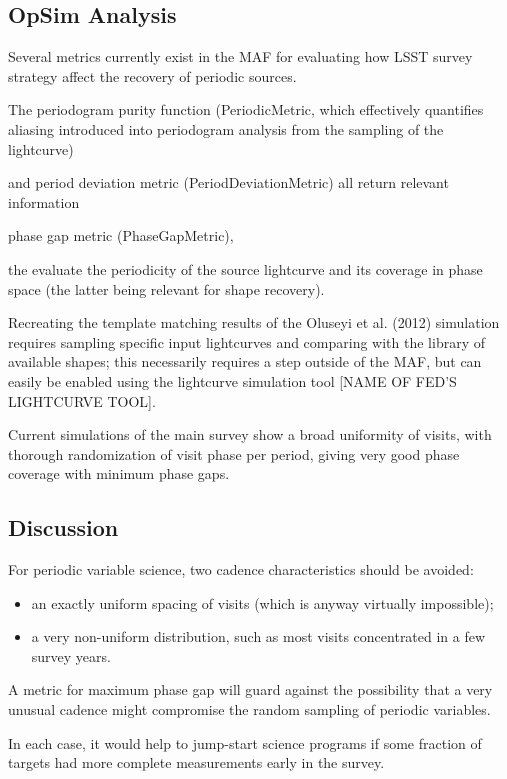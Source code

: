 
\subsection{OpSim Analysis}
\label{sec:\secname:analysis}


Several metrics currently exist in the MAF for evaluating how LSST survey strategy affect the recovery of periodic sources. 

The periodogram purity function (PeriodicMetric, which effectively quantifies aliasing introduced into periodogram analysis from the sampling of the lightcurve)

and period deviation metric (PeriodDeviationMetric) all return relevant information 

phase gap metric (PhaseGapMetric),

the evaluate the periodicity of the source lightcurve and its coverage in phase space (the latter being relevant for shape recovery). 

Recreating the template matching results of the Oluseyi et al. (2012) simulation requires sampling specific input lightcurves and comparing with the library of available shapes; this necessarily requires a step outside of the MAF, but can easily be enabled using the lightcurve simulation tool [NAME OF FED'S LIGHTCURVE TOOL].
 



Current simulations of the main survey show a broad uniformity of visits, with thorough randomization of visit phase per period, giving very good phase coverage with minimum phase gaps.



\subsection{Discussion}
\label{sec:\secname:discussion}

For periodic variable science, two cadence characteristics should be avoided:
\begin{itemize}
\item an exactly uniform spacing of visits (which is anyway virtually impossible); \
\item a very non-uniform distribution, such as most visits concentrated in a few survey years.
 \end{itemize}

A metric for maximum phase gap will guard against the possibility that a very unusual cadence might compromise the random sampling of periodic variables.

In each case, it would help to jump-start science programs if some fraction of targets had more complete measurements early in the survey.



\navigationbar
